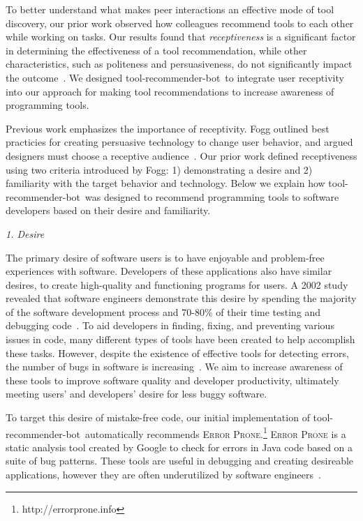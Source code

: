 \documentclass[conference]{IEEEtran}
\newcommand{\tool}{tool-recommender-bot}
\newcommand{\pseudosection}[1]{\vspace{2mm} \noindent {\bf #1}}
\newcommand{\pseudosubsection}[1]{\vspace{2mm} {\it #1}}
\begin{document}
To better understand what makes peer interactions an effective mode of tool discovery, our prior work observed how colleagues recommend tools to each other while working on tasks. Our results found that \emph{receptiveness} is a significant factor in determining the effectiveness of a tool recommendation, while other characteristics, such as politeness and persuasiveness, do not significantly impact the outcome~\cite{vlhcc17}. We designed \tool~to integrate user receptivity into our approach for making tool recommendations to increase awareness of programming tools.

\pseudosection{Receptiveness}

Previous work emphasizes the importance of receptivity. Fogg outlined best practicies for creating persuasive technology to change user behavior, and argued designers must choose a receptive audience~\cite{FoggPersuasive}. Our prior work defined receptiveness using two criteria introduced by Fogg: 1) demonstrating a desire and 2) familiarity with the target behavior and technology. Below we explain how \tool~was designed to recommend programming tools to software developers based on their desire and familiarity.

\pseudosubsection{1. Desire}

The primary desire of software users is to have enjoyable and problem-free experiences with software. Developers of these applications also have similar desires, to create high-quality and functioning programs for users. A 2002 study revealed that software engineers demonstrate this desire by spending the majority of the software development process and 70-80\% of their time testing and debugging code~\cite{NIST}. To aid developers in finding, fixing, and preventing various issues in code, many different types of tools have been created to help accomplish these tasks. However, despite the existence of effective tools for detecting errors, the number of bugs in software is increasing~\cite{HaveThingsChanged}. We aim to increase awareness of these tools to improve software quality and developer productivity, ultimately meeting users' and developers' desire for less buggy software.

To target this desire of mistake-free code, our initial implementation of \tool~automatically recommends \textsc{Error Prone}.\footnote{http://errorprone.info} \textsc{Error Prone} is a static analysis tool created by Google to check for errors in Java code based on a suite of bug patterns. These tools are useful in debugging and creating desireable applications, however they are often underutilized by software engineers~\cite{Johnson2013Why}. 
\end{document}
